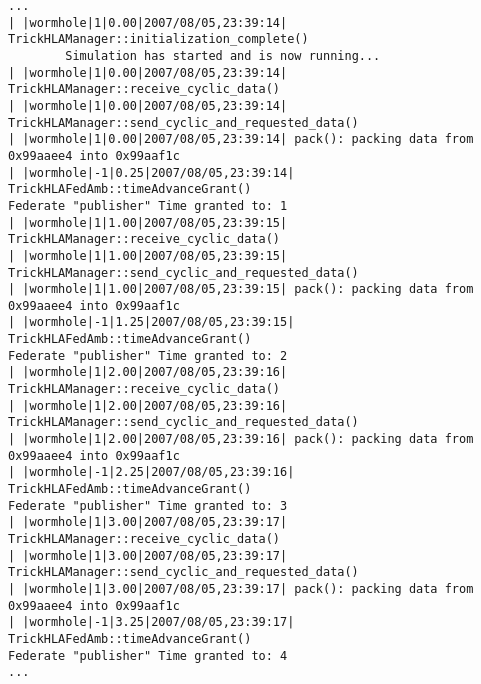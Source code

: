 \begin{lstlisting}[numbers=none,caption={Output from the unpacker simulation}]
...
| |wormhole|1|0.00|2007/08/05,23:39:14| TrickHLAManager::initialization_complete()
        Simulation has started and is now running...
| |wormhole|1|0.00|2007/08/05,23:39:14| TrickHLAManager::receive_cyclic_data()
| |wormhole|1|0.00|2007/08/05,23:39:14| TrickHLAManager::send_cyclic_and_requested_data()
| |wormhole|1|0.00|2007/08/05,23:39:14| pack(): packing data from 0x99aaee4 into 0x99aaf1c
| |wormhole|-1|0.25|2007/08/05,23:39:14| TrickHLAFedAmb::timeAdvanceGrant()
Federate "publisher" Time granted to: 1
| |wormhole|1|1.00|2007/08/05,23:39:15| TrickHLAManager::receive_cyclic_data()
| |wormhole|1|1.00|2007/08/05,23:39:15| TrickHLAManager::send_cyclic_and_requested_data()
| |wormhole|1|1.00|2007/08/05,23:39:15| pack(): packing data from 0x99aaee4 into 0x99aaf1c
| |wormhole|-1|1.25|2007/08/05,23:39:15| TrickHLAFedAmb::timeAdvanceGrant()
Federate "publisher" Time granted to: 2
| |wormhole|1|2.00|2007/08/05,23:39:16| TrickHLAManager::receive_cyclic_data()
| |wormhole|1|2.00|2007/08/05,23:39:16| TrickHLAManager::send_cyclic_and_requested_data()
| |wormhole|1|2.00|2007/08/05,23:39:16| pack(): packing data from 0x99aaee4 into 0x99aaf1c
| |wormhole|-1|2.25|2007/08/05,23:39:16| TrickHLAFedAmb::timeAdvanceGrant()
Federate "publisher" Time granted to: 3
| |wormhole|1|3.00|2007/08/05,23:39:17| TrickHLAManager::receive_cyclic_data()
| |wormhole|1|3.00|2007/08/05,23:39:17| TrickHLAManager::send_cyclic_and_requested_data()
| |wormhole|1|3.00|2007/08/05,23:39:17| pack(): packing data from 0x99aaee4 into 0x99aaf1c
| |wormhole|-1|3.25|2007/08/05,23:39:17| TrickHLAFedAmb::timeAdvanceGrant()
Federate "publisher" Time granted to: 4
...
\end{lstlisting}
